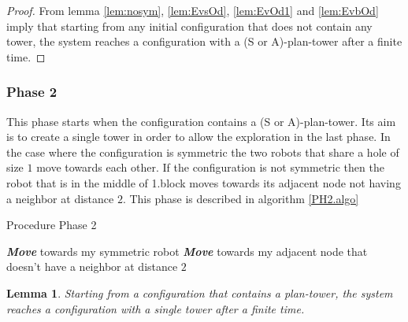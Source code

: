 \documentclass[12pt]{llncs}
\newtheorem{lem}{Lemma}
\begin{document}
\begin{proof}
From lemma \ref{lem:nosym}, \ref{lem:EvsOd}, \ref{lem:EvOd1} and \ref{lem:EvbOd} imply that starting from any initial configuration that does not contain any tower, the system reaches a configuration with a (S or A)-plan-tower after a finite time.  
\end{proof}











\subsubsection{\textbf{Phase 2}}

This phase starts when the configuration contains a (S or A)-plan-tower. Its aim is to create a single tower in order to allow the exploration in the last phase.
In the case where the configuration is symmetric the two robots that share a hole of size $1$ move towards each other. If the configuration is not symmetric then the robot that is in the middle of 1.block moves towards its adjacent node not having a neighbor at distance $2$. This phase is described in algorithm \ref{PH2.algo}

\begin{algorithm}[H]
\caption{Procedure Phase 2}
\label{PH2.algo}
\begin{algorithmic}[1]

            \State \textit{\textbf{Move}} towards my symmetric robot
         \EndIf
     \Else
             \State \textit{\textbf{Move}} towards my adjacent node that doesn't have a neighbor at distance $2$
        \EndIf
    \EndIf
\EndIf
\end{algorithmic}
\end{algorithm}

\begin{lem}
\label{lem:PH2}
Starting from a configuration that contains a plan-tower, the system reaches a configuration with a single tower after a finite time.
\end{lem}
\end{document}
